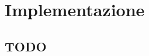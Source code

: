\documentclass[./main.tex]{subfiles}
\begin{document}
\chapter{Implementazione}
\section{TODO}
\end{document}
